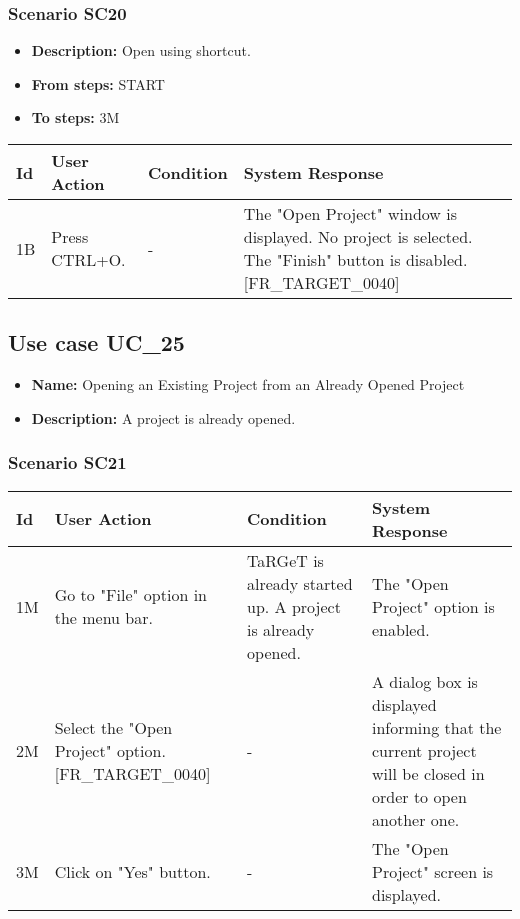 \documentclass[a4paper,11pt]{article}
\newcommand{\bl}{\\ \hline}
\begin{document}
\subsubsection*{Scenario SC20}
\begin{itemize}
\item {\bf Description:} Open using shortcut.
\item {\bf From steps:} START
\item {\bf To steps:} 3M
\end{itemize}
\begin{tabular}{|p{0.4in}|p{1.5in}|p{1.5in}|p{1.5in}|}
\hline
Id & User Action & Condition & System Response \bl 
1B & Press CTRL+O. & - & The "Open Project" window is displayed. No project is
						selected. The "Finish" button is disabled. [FR_TARGET_0040]
					\bl
\end{tabular}
\subsection*{Use case UC_25}
\begin{itemize}
\item {\bf Name: }Opening an Existing Project from an Already Opened Project
			
\item {\bf Description: }A project is already opened.
\end{itemize}
\subsubsection*{Scenario SC21}
\begin{tabular}{|p{0.4in}|p{1.5in}|p{1.5in}|p{1.5in}|}
\hline
Id & User Action & Condition & System Response \bl 
1M & Go to "File" option in the menu bar.   & TaRGeT is already started up. A project is already
						opened. &  The "Open Project" option is enabled. \bl
2M & Select the "Open Project" option. [FR_TARGET_0040]  & - & A dialog box is displayed informing that the current
						project will be closed in order to open another one. \bl
3M & Click on "Yes" button. & - & The "Open Project" screen is displayed. \bl
\end{tabular}
\end{document}
